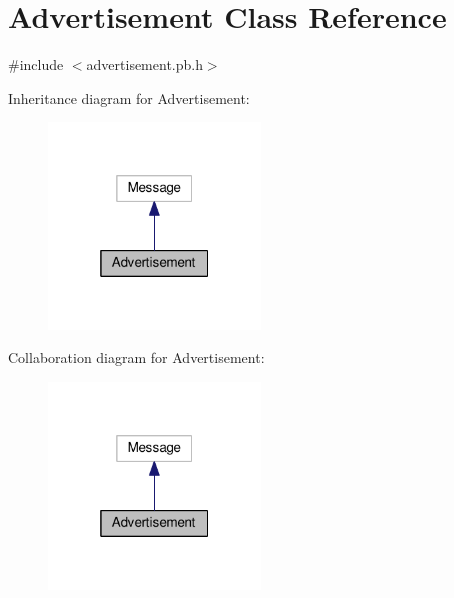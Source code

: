 \hypertarget{class_advertisement}{}\section{Advertisement Class Reference}
\label{class_advertisement}


{\ttfamily \#include $<$advertisement.\+pb.\+h$>$}



Inheritance diagram for Advertisement\+:
\nopagebreak
\begin{figure}[H]
\begin{center}
\leavevmode
\includegraphics[width=160pt]{class_advertisement__inherit__graph}
\end{center}
\end{figure}


Collaboration diagram for Advertisement\+:
\nopagebreak
\begin{figure}[H]
\begin{center}
\leavevmode
\includegraphics[width=160pt]{class_advertisement__coll__graph}
\end{center}
\end{figure}
